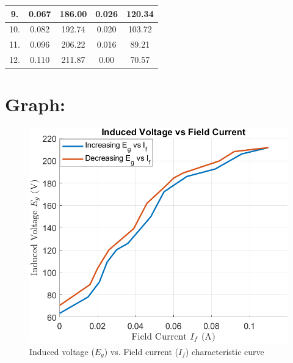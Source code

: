 \documentclass[a4paper,12pt]{article}
\begin{document}
\begin{table}[H]
{\begin{tabular}{|c|cc|cc|}
		9.                                    & \multicolumn{1}{c|}{0.067}                                                                               & 186.00                                                                       & \multicolumn{1}{c|}{0.026}                                                                       & 120.34                                                                       \\ \hline
		10.                                   & \multicolumn{1}{c|}{0.082}                                                                               & 192.74                                                                       & \multicolumn{1}{c|}{0.020}                                                                       & 103.72                                                                       \\ \hline
		11.                                   & \multicolumn{1}{c|}{0.096}                                                                               & 206.22                                                                       & \multicolumn{1}{c|}{0.016}                                                                       & 89.21                                                                        \\ \hline
		12.                                   & \multicolumn{1}{c|}{0.110}                                                                               & 211.87                                                                       & \multicolumn{1}{c|}{0.00}                                                                        & 70.57                                                                        \\ \hline
	\end{tabular}}
\end{table}

\section{Graph:}
\begin{figure}[H]
	\centering
	\includegraphics[width=0.8\linewidth]{Images/3.3}
	\caption{Induced voltage ($E_g$) vs. Field current ($I_f$) characteristic curve}
	\label{fig:3}
\end{figure}
\newpage
\end{document}
